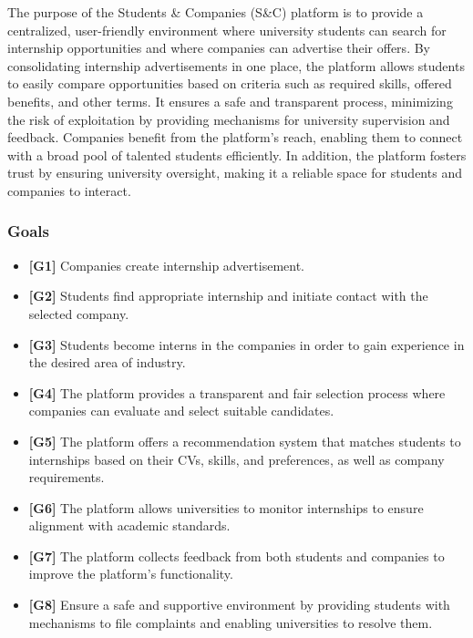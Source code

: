 \quad The purpose of the Students \& Companies (S\&C) platform is to provide a centralized, user-friendly environment where university students can search for internship opportunities and where companies can advertise their offers. By consolidating internship advertisements in one place, the platform allows students to easily compare opportunities based on criteria such as required skills, offered benefits, and other terms. It ensures a safe and transparent process, minimizing the risk of exploitation by providing mechanisms for university supervision and feedback. Companies benefit from the platform’s reach, enabling them to connect with a broad pool of talented students efficiently. In addition, the platform fosters trust by ensuring university oversight, making it a reliable space for students and companies to interact.

\subsubsection{Goals}
\begin{itemize}
    \item \textbf{[G1]} Companies create internship advertisement.
    \item \textbf{[G2]} Students find appropriate internship and initiate contact with the selected company.
    \item \textbf{[G3]} Students become interns in the companies in order to gain experience in the desired area of industry.
    \item \textbf{[G4]} The platform provides a transparent and fair selection process where companies can evaluate and select suitable candidates.
    \item \textbf{[G5]} The platform offers a recommendation system that matches students to internships based on their CVs, skills, and preferences, as well as company requirements.
    \item \textbf{[G6]} The platform allows universities to monitor internships to ensure alignment with academic standards.
    \item \textbf{[G7]} The platform collects feedback from both students and companies to improve the platform’s functionality.
    \item \textbf{[G8]} Ensure a safe and supportive environment by providing students with mechanisms to file complaints and enabling universities to resolve them.
    
\end{itemize}